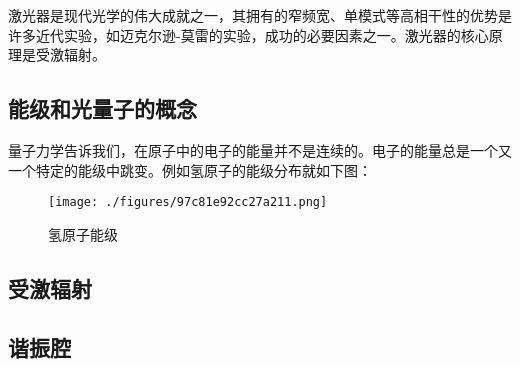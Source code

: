 
激光器是现代光学的伟大成就之一，其拥有的窄频宽、单模式等高相干性的优势是许多近代实验，如迈克尔逊-莫雷的实验，成功的必要因素之一。激光器的核心原理是受激辐射。

\subsection{能级和光量子的概念}
量子力学告诉我们，在原子中的电子的能量并不是连续的。电子的能量总是一个又一个特定的能级中跳变。例如氢原子的能级分布就如下图：\begin{figure}[ht]
\centering
\texttt{[image: ./figures/97c81e92cc27a211.png]}
\caption{氢原子能级} \label{fig_LaserT_1}
\end{figure}

\subsection{受激辐射}
\subsection{谐振腔}
